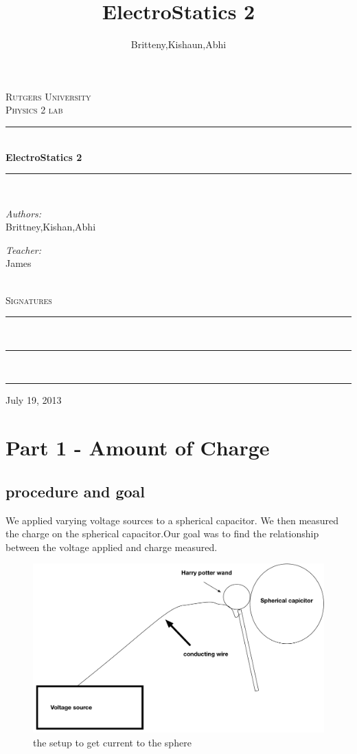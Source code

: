 \documentclass[12pt]{article}
\title{ElectroStatics 2}
\author{Britteny,Kishaun,Abhi}
\begin{document}
\begin{titlepage}
\begin{center}
	\textsc{\LARGE Rutgers University}\\[1.5 cm]
    \textsc{\Large Physics 2 lab}\\[0.5cm]
    \rule{\linewidth}{0.5mm} \\ [.4 cm]
    {\huge \bfseries ElectroStatics 2}\\[.4 cm]
    \rule{\linewidth}{0.5mm} \\ [1.5 cm]
    \begin{minipage}{0.4\textwidth}
	\begin{flushleft} \large
	\emph{Authors:}\\
	Brittney,Kishan,Abhi
	\end{flushleft}
	\end{minipage}
	\begin{minipage}{0.4\textwidth}
	\begin{flushright} \large
	\emph{Teacher:} \\
	James
	\end{flushright}
	\end{minipage}\\[2 cm]
	\textsc{ \Large Signatures} \\[1.7 cm] 
	\rule{10 cm}{0.5mm} \\ [2.0 cm]
	\rule{10 cm}{0.5mm} \\ [2.0 cm]
	\rule{10 cm}{0.5mm}
	\vfill
	{\large {July 19, 2013}}
\end{center}
\end{titlepage}

\section*{Part 1 - Amount of Charge}

\subsection*{procedure and goal}
	
	 We applied varying voltage sources to a spherical capacitor. We then measured the charge on the spherical capacitor.Our goal was to find the relationship between the voltage applied and charge measured. 
	 \begin{figure}[h]
	 \centering
	 \includegraphics[scale = .4]{diagram1}
	 \caption{the setup to get current to the sphere}
	 \end{figure}
\end{document}
